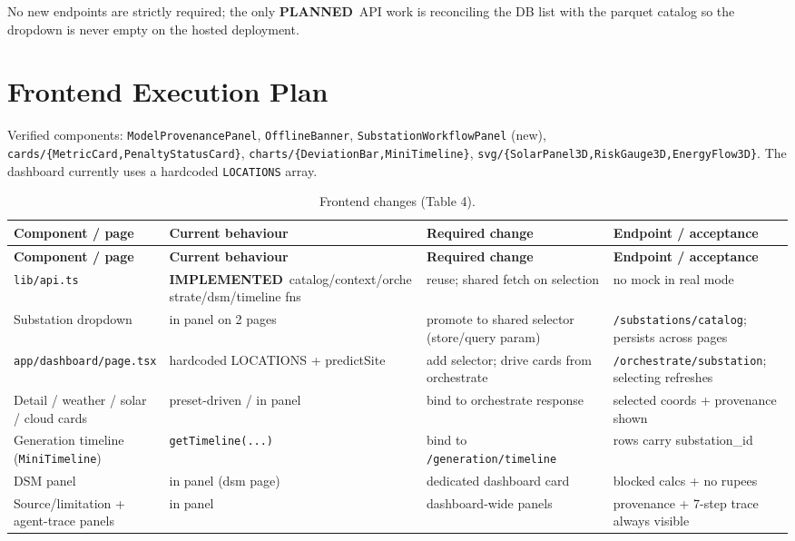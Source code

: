 \documentclass[11pt,a4paper]{article}
\newcommand{\stImpl}{\textcolor{cok}{\textbf{IMPLEMENTED}}}
\newcommand{\stPlan}{\textcolor{cplan}{\textbf{PLANNED}}}
\newcommand{\code}[1]{\texttt{\small #1}}
\begin{document}
\noindent No new endpoints are strictly required; the only \stPlan\ API work is reconciling the DB
list with the parquet catalog so the dropdown is never empty on the hosted deployment.

\section{Frontend Execution Plan}
Verified components: \code{ModelProvenancePanel}, \code{OfflineBanner},
\code{SubstationWorkflowPanel} (new), \code{cards/\{MetricCard,PenaltyStatusCard\}},
\code{charts/\{DeviationBar,MiniTimeline\}}, \code{svg/\{SolarPanel3D,RiskGauge3D,EnergyFlow3D\}}.
The dashboard currently uses a hardcoded \code{LOCATIONS} array.

\begin{footnotesize}
\begin{longtable}{@{}p{3.0cm}p{3.4cm}p{3.4cm}p{3.6cm}@{}}
\caption{Frontend changes (Table 4).}\label{tab:fe}\\
\toprule
\textbf{Component / page} & \textbf{Current behaviour} & \textbf{Required change} & \textbf{Endpoint / acceptance}\\
\midrule
\endfirsthead
\toprule
\textbf{Component / page} & \textbf{Current behaviour} & \textbf{Required change} & \textbf{Endpoint / acceptance}\\
\midrule
\endhead
\bottomrule
\endfoot
\code{lib/api.ts} & \stImpl\ catalog/context/orchestrate/dsm/timeline fns & reuse; shared fetch on selection & no mock in real mode\\
Substation dropdown & in panel on 2 pages & promote to shared selector (store/query param) & \code{/substations/catalog}; persists across pages\\
\code{app/dashboard/page.tsx} & hardcoded LOCATIONS + predictSite & add selector; drive cards from orchestrate & \code{/orchestrate/substation}; selecting refreshes\\
Detail / weather / solar / cloud cards & preset-driven / in panel & bind to orchestrate response & selected coords + provenance shown\\
Generation timeline (\code{MiniTimeline}) & \code{getTimeline(...)} & bind to \code{/generation/timeline} & rows carry substation\_id\\
DSM panel & in panel (dsm page) & dedicated dashboard card & blocked calcs + no rupees\\
Source/limitation + agent-trace panels & in panel & dashboard-wide panels & provenance + 7-step trace always visible\\
\end{longtable}
\end{footnotesize}
\end{document}
